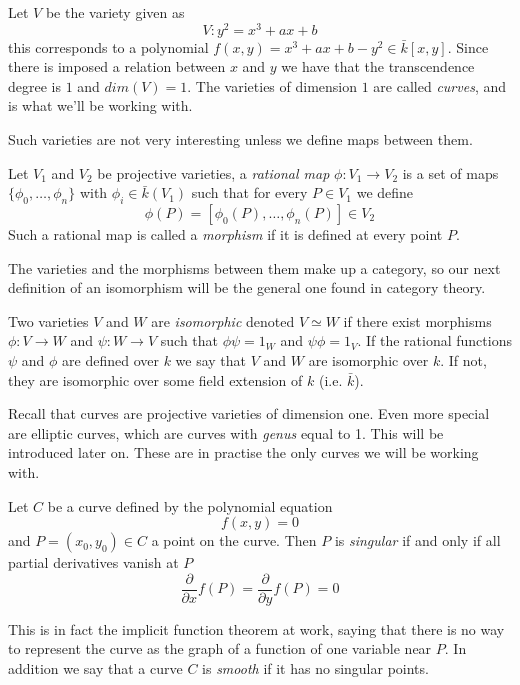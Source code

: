 \begin{ex}
 Let $V$ be the variety given as
$$ V: y^2 = x^3 + ax + b $$
this corresponds to a polynomial $f(x,y) = x^3+ax+b-y^2 \in \bar{k}[x,y]$. Since there
is imposed a relation between $x$ and $y$ we  have that the transcendence degree is $1$ and
$dim(V)=1$. The varieties of dimension $1$ are called \emph{curves}, and is what we'll be working with.
\end{ex}

Such varieties are not very interesting unless we define maps between them.

\begin{mydef}
 Let $V_1$ and $V_2$ be projective varieties, a \emph{rational map} $\phi: V_1 \rightarrow V_2$
is a set of maps $\{\phi_0,\ldots,\phi_n\}$ with $\phi_i \in \bar{k}(V_1)$ such that for every
$P\in V_1$ we define
$$\phi(P) = [\phi_0(P),\ldots,\phi_n(P)] \in V_2$$
Such a rational map is called a \emph{morphism} if it is defined at every point $P$.
\end{mydef}

The varieties and the morphisms between them make up a category, so our next
definition of an isomorphism will be the general one found in category theory.

\begin{mydef}
 Two varieties $V$ and $W$ are \emph{isomorphic} denoted $V\simeq W$
if there exist morphisms $\phi: V \rightarrow W$ and $\psi: W \rightarrow V$ such that
$\phi \psi = 1_W$ and $\psi \phi = 1_V$.
If the rational functions $\psi$ and $\phi$ are defined over $k$ we say that $V$ and $W$
are isomorphic over $k$. If not, they are isomorphic over some field extension of $k$
(i.e. $\bar{k}$).
\end{mydef}

Recall that curves are projective varieties of dimension one. Even more special
are elliptic curves, which are curves with \emph{genus} equal to 1. This will
be introduced later on. These are in practise the only curves we will be working with.

\begin{mydef}
 Let $C$ be a curve defined by the polynomial equation
$$f(x,y) = 0$$
and $P=(x_0,y_0) \in C$ a point on the curve. Then $P$ is \emph{singular} if and only if all
partial derivatives vanish at $P$
$$\frac{\partial}{\partial x}f(P) = \frac{\partial}{\partial y}f(P) = 0$$
\end{mydef}

This is in fact the implicit function theorem at work, saying that there is no way to
represent the curve as the graph of a function of one variable near $P$.
In addition we say that a curve $C$ is \emph{smooth} if it has no singular points.

